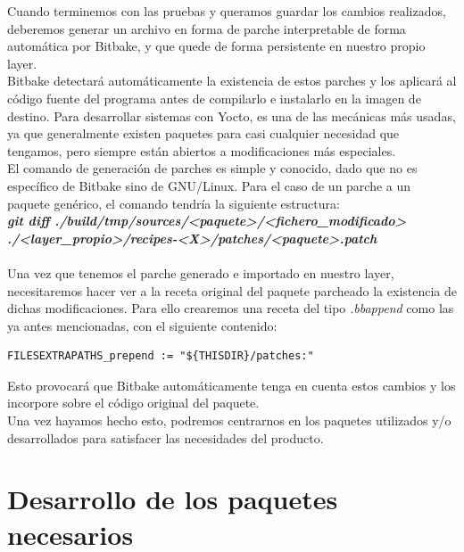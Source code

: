 Cuando terminemos con las pruebas y queramos guardar los cambios realizados, deberemos generar un archivo en forma de parche interpretable de forma automática por Bitbake, y que quede de forma persistente en nuestro propio layer.\\

Bitbake detectará automáticamente la existencia de estos parches y los aplicará al código fuente del programa antes de compilarlo e instalarlo en la imagen de destino. Para desarrollar sistemas con Yocto, es una de las mecánicas más usadas, ya que generalmente existen paquetes para casi cualquier necesidad que tengamos, pero siempre están abiertos a modificaciones más especiales.\\

El comando de generación de parches es simple y conocido, dado que no es específico de Bitbake sino de GNU/Linux. Para el caso de un parche a un paquete genérico, el comando tendría la siguiente estructura:\\

\textit{\textbf{git diff ./build/tmp/sources/<paquete>/<fichero\_modificado> \\./<layer\_propio>/recipes-<X>/patches/<paquete>.patch}}\\

\noindent\makebox[\linewidth]{\rule{\textwidth}{0.4pt}}\\

Una vez que tenemos el parche generado e importado en nuestro layer, necesitaremos hacer ver a la receta original del paquete parcheado la existencia de dichas modificaciones. Para ello crearemos una receta del tipo \textit{.bbappend} como las ya antes mencionadas, con el siguiente contenido:

\begin{lstlisting}
FILESEXTRAPATHS_prepend := "${THISDIR}/patches:"
\end{lstlisting}

Esto provocará que Bitbake automáticamente tenga en cuenta estos cambios y los incorpore sobre el código original del paquete.\\

Una vez hayamos hecho esto, podremos centrarnos en los paquetes utilizados y/o desarrollados para satisfacer las necesidades del producto.

\section{Desarrollo de los paquetes necesarios}



